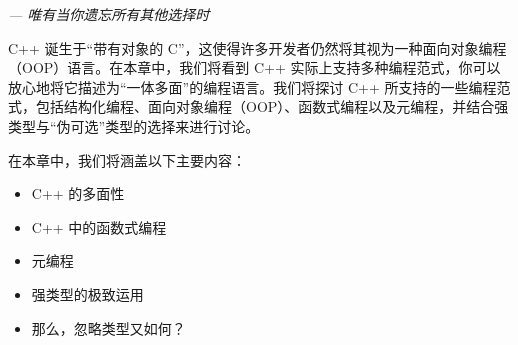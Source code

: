 
\begin{flushright}
\textit{--- 唯有当你遗忘所有其他选择时}
\end{flushright}

C++ 诞生于“带有对象的 C”，这使得许多开发者仍然将其视为一种面向对象编程（OOP）语言。在本章中，我们将看到 C++ 实际上支持多种编程范式，你可以放心地将它描述为“一体多面”的编程语言。我们将探讨 C++ 所支持的一些编程范式，包括结构化编程、面向对象编程（OOP）、函数式编程以及元编程，并结合强类型与“伪可选”类型的选择来进行讨论。

在本章中，我们将涵盖以下主要内容：

\begin{itemize}
\item 
C++ 的多面性

\item 
C++ 中的函数式编程

\item 
元编程

\item 
强类型的极致运用

\item 
那么，忽略类型又如何？
\end{itemize}

